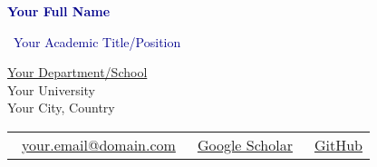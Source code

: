 \documentclass[11pt, a4paper]{article}
\newcommand{\sectioncolor}[1]{\textcolor{darkblue}{#1}}
\newcommand{\emailicon}{\faEnvelope}
\newcommand{\scholaricon}{\faGraduationCap}
\newcommand{\githubicon}{\faGithub}
\begin{document}
\begin{center}
    {\Huge\bfseries\sectioncolor{Your Full Name}}
    
    \vspace{8pt}
    
    {\large\sectioncolor{\faGraduationCap\ Your Academic Title/Position}}
    
    \vspace{10pt}
    
    {\href{https://your-institution.edu}{Your Department/School} \\
    Your University \\
    Your City, Country}
    
    \vspace{12pt}
    
    \begin{tabular}{c c c}
        \emailicon\ \href{mailto:your.email@domain.com}{your.email@domain.com} &
        \scholaricon\ \href{https://scholar.google.com/citations?user=YOUR_ID}{Google Scholar} &
        \githubicon\ \href{https://github.com/yourusername}{GitHub}
    \end{tabular}
\end{center}

\vspace{20pt}
\end{document}
